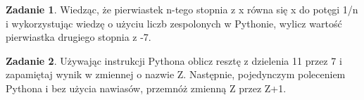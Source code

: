 \documentclass[11pt]{article}
\theoremstyle{definition}
\newtheorem{zadanie}{Zadanie}
\begin{document}
\begin{zadanie}
Wiedząc, że pierwiastek n-tego stopnia z x równa się x do potęgi 1/n i wykorzystując wiedzę o użyciu liczb zespolonych w Pythonie, wylicz wartość pierwiastka drugiego stopnia z -7.
\end{zadanie}
\begin{zadanie}

Używając instrukcji Pythona oblicz resztę z dzielenia 11 przez 7 i zapamiętaj wynik w zmiennej o nazwie Z. Następnie, pojedynczym poleceniem Pythona i bez użycia nawiasów, przemnóż zmienną Z przez Z+1.
\end{zadanie}
%
%
%
%
%
%
%
%
%
%
%
%
%
%
%
%
%
%
\end{document}
